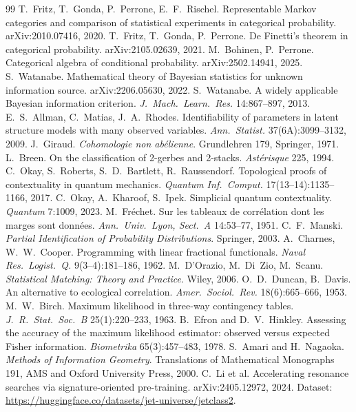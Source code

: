 \documentclass[11pt]{article}
\theoremstyle{definition}
\theoremstyle{remark}
\begin{document}
\begin{thebibliography}{99}
 T.~Fritz, T.~Gonda, P.~Perrone, E.~F.~Rischel. Representable Markov categories and comparison of statistical experiments in categorical probability. arXiv:2010.07416, 2020.
 T.~Fritz, T.~Gonda, P.~Perrone. De Finetti's theorem in categorical probability. arXiv:2105.02639, 2021.
 M.~Bohinen, P.~Perrone. Categorical algebra of conditional probability. arXiv:2502.14941, 2025.
 S.~Watanabe. Mathematical theory of Bayesian statistics for unknown information source. arXiv:2206.05630, 2022.
 S.~Watanabe. A widely applicable Bayesian information criterion. \emph{J.\ Mach.\ Learn.\ Res.} 14:867--897, 2013.
 E.~S.~Allman, C.~Matias, J.~A.~Rhodes. Identifiability of parameters in latent structure models with many observed variables. \emph{Ann.\ Statist.} 37(6A):3099--3132, 2009.
 J.~Giraud. \emph{Cohomologie non ab\'elienne}. Grundlehren 179, Springer, 1971.
 L.~Breen. On the classification of 2-gerbes and 2-stacks. \emph{Ast\'erisque} 225, 1994.
 C.~Okay, S.~Roberts, S.~D.~Bartlett, R.~Raussendorf. Topological proofs of contextuality in quantum mechanics. \emph{Quantum Inf.\ Comput.} 17(13--14):1135--1166, 2017.
 C.~Okay, A.~Kharoof, S.~Ipek. Simplicial quantum contextuality. \emph{Quantum} 7:1009, 2023.
 M.~Fr\'echet. Sur les tableaux de corr\'elation dont les marges sont donn\'ees. \emph{Ann.\ Univ.\ Lyon, Sect.\ A} 14:53--77, 1951.
 C.~F.~Manski. \emph{Partial Identification of Probability Distributions}. Springer, 2003.
 A.~Charnes, W.~W.~Cooper. Programming with linear fractional functionals. \emph{Naval Res.\ Logist.\ Q.} 9(3--4):181--186, 1962.
 M.~D'Orazio, M.~Di~Zio, M.~Scanu. \emph{Statistical Matching: Theory and Practice}. Wiley, 2006.
 O.~D.~Duncan, B.~Davis. An alternative to ecological correlation. \emph{Amer.\ Sociol.\ Rev.} 18(6):665--666, 1953.
 M.~W.~Birch. Maximum likelihood in three-way contingency tables. \emph{J.\ R.\ Stat.\ Soc.\ B} 25(1):220--233, 1963.
 B.~Efron and D.~V.~Hinkley. Assessing the accuracy of the maximum likelihood estimator: observed versus expected Fisher information. \emph{Biometrika} 65(3):457--483, 1978.
 S.~Amari and H.~Nagaoka. \emph{Methods of Information Geometry}. Translations of Mathematical Monographs 191, AMS and Oxford University Press, 2000.
 C.~Li et al. Accelerating resonance searches via signature-oriented pre-training. arXiv:2405.12972, 2024. Dataset: \url{https://huggingface.co/datasets/jet-universe/jetclass2}.

\end{thebibliography}
\end{document}
